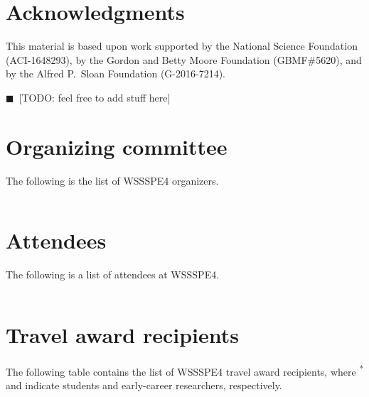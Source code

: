 \documentclass[11pt, oneside]{amsart}
\newcommand{\todo}[1]{{\color{blue}$\blacksquare$~\textsf{[TODO: #1]}}}
\begin{document}
\section*{Acknowledgments} \label{sec:acks}

This material is based upon work supported by the National Science
Foundation (ACI-1648293), by the Gordon and Betty Moore Foundation  (GBMF\#5620), and by the Alfred P.~Sloan Foundation (G-2016-7214).

%
\todo{feel free to add stuff here}

\newpage
\appendix
\section{Organizing committee}  \label{sec:orgcom}

The following is the list of WSSSPE4 organizers.

{\scriptsize
\begin{longtable}{lll}

\end{longtable}
}


\section{Attendees}  \label{sec:attendees}
The following is a list of attendees at WSSSPE4.

{\scriptsize
\begin{longtable}{lll}

\end{longtable}
}

\section{Travel award recipients}  \label{sec:awardees}
The following table contains the list of WSSSPE4 travel award recipients, where
\textsuperscript{*} and \textsuperscript{\textdagger} indicate students and
early-career researchers, respectively.
\end{document}
